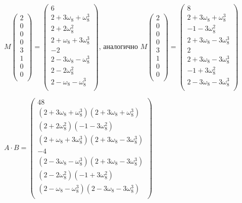 \documentclass[a4paper,12pt]{article} %
\begin{document}
$M
\begin{pmatrix}
2\\  0\\ 0\\ 0\\ 3\\  1\\ 0\\ 0\\
\end{pmatrix}=\begin{pmatrix}
6\\  2+3\omega_8+\omega_8^3\\ 2+2\omega_8^2\\ 2+\omega_8+3\omega_8^3\\ -2\\  2-3\omega_8-\omega_8^3\\ 2-2\omega_8^2\\ 2-\omega_8-\omega_8^3\\
\end{pmatrix}$, аналогично $M
\begin{pmatrix}
2\\  0\\ 0\\ 0\\ 3\\  1\\ 0\\ 0\\
\end{pmatrix}=\begin{pmatrix}
8\\  2+3\omega_8+\omega_8^3\\ -1-3\omega_8^2\\ 2+3\omega_8-3\omega_8^3\\ 2\\  2+3\omega_8-3\omega_8^3\\ -1+3\omega_8^2\\ 2-3\omega_8-3\omega_8^3\\
\end{pmatrix}$

$A\cdot B =\begin{pmatrix}
	48\\  (2+3\omega_8+\omega_8^3)(2+3\omega_8+\omega_8^3)\\ (2+2\omega_8^2)(-1-3\omega_8^2)\\ (2+\omega_8+3\omega_8^3)(2+3\omega_8-3\omega_8^3)\\ -4\\  (2-3\omega_8-\omega_8^3)(2+3\omega_8-3\omega_8^3)\\ (2-2\omega_8^2)(-1+3\omega_8^2)\\ (2-\omega_8-\omega_8^3)(2-3\omega_8-3\omega_8^3)\\
\end{pmatrix}$
\end{document}
